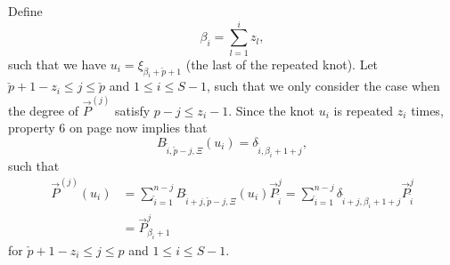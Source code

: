 Define
\begin{equation*}
	\beta_i = \sum_{l=1}^i z_l,
\end{equation*}
such that we have $u_i = \xi_{\beta_i+\check{p}+1}$ (the last of the repeated knot). Let $\check{p}+1-z_i\leq j\leq \check{p}$ and $1\leq i\leq S-1$, such that we only consider the case when the degree of $\vec{P}^{(j)}$ satisfy $p-j\leq z_i-1$. Since the knot $u_i$ is repeated $z_i$ times, property 6 on page \pageref{List:properties} now implies that
\begin{equation*}
	B_{\tilde{i},\check{p}-j,\Xi}(u_i) = \delta_{\tilde{i},\beta_i+1+j},
\end{equation*}
such that
\begin{align*}
	\vec{P}^{(j)}(u_i) &= \sum_{\tilde{i}=1}^{n-j} B_{\tilde{i}+j,\check{p}-j,\Xi}(u_i) \vec{P}_{\tilde{i}}^j = \sum_{\tilde{i}=1}^{n-j} \delta_{\tilde{i}+j,\beta_i+1+j} \vec{P}_{\tilde{i}}^j\\
	&= \vec{P}_{\beta_i+1}^j
\end{align*}
for $\check{p}+1-z_i\leq j\leq p$ and $1\leq i\leq S-1$.

